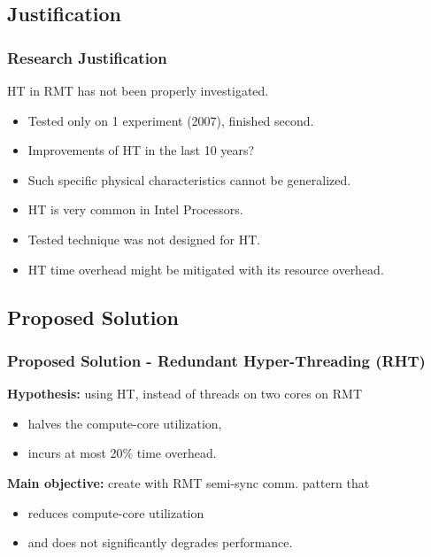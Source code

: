 \documentclass[xcolor=pdftex,dvipsnames,table]{beamer}
\begin{document}
\subsection{Justification}
\begin{frame}
	\frametitle{Research Justification}
    
    \begin{shaded}
    	\centerline{HT in RMT has not been properly investigated.}
    \end{shaded}
    
    \begin{itemize}
        \item Tested only on 1 experiment (2007), finished second.
        \item Improvements of HT in the last 10 years? \pause
        
        \item Such specific physical characteristics cannot be generalized.  
        \item HT is very common in Intel Processors. \pause
        
        \item Tested technique was not designed for HT.        
        \item HT time overhead might be mitigated with its resource overhead. 
     \end{itemize}
\end{frame}


\subsection{Proposed Solution}
\begin{frame}
	\frametitle{Proposed Solution - Redundant Hyper-Threading (RHT)}
    
    \textbf{Hypothesis:} using HT, instead of threads on two cores on RMT
    \begin{itemize}
    	\item halves the compute-core utilization,
    	\item incurs at most 20\% time overhead.
    \end{itemize}    
    
    \vskip 0.2in
    
    \textbf {Main objective:} create with RMT semi-sync comm. pattern that
    \begin{itemize}
        \item reduces compute-core utilization
        \item and does not significantly degrades performance.
    \end{itemize}
        
            
\end{frame}
\end{document}
